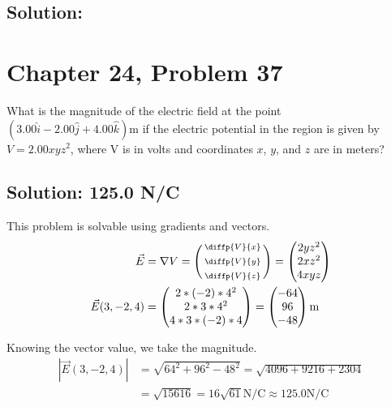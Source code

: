 \documentclass[12pt]{article}
\begin{document}
\subsection{Solution: }


\section{Chapter 24, Problem 37}
What is the magnitude of the electric field at the point $(3.00\hat{i} - 2.00\hat{j} + 4.00\hat{k}) \unit{\meter}$ if the electric potential in the region is given by $V = 2.00xyz^2$, where V is in volts and coordinates $x$, $y$, and $z$ are in meters?

\subsection*{Solution: 125.0 N/C}
This problem is solvable using gradients and vectors.
\begin{align*}
    \vec{E} &=  \nabla V
        =   \left(\begin{smallmatrix} \diffp{V}{x}\\ \\ \diffp{V}{y}\\ \\ \diffp{V}{z} \end{smallmatrix}\right)
        =   \begin{pmatrix} 2yz^2\\ 2xz^2\\ 4xyz \end{pmatrix}\\
    \vec{E}(3, -2, 4)   &=  \begin{pmatrix} 2*(-2)*4^2\\ 2*3*4^2\\ 4*3*(-2)*4 \end{pmatrix}
        =   \begin{pmatrix} -64 \\ 96 \\ -48 \end{pmatrix} \unit{\meter}
\end{align*}

Knowing the vector value, we take the magnitude.
\begin{align*}
    \left|\vec{E}(3, -2, 4)\right|  &=  \sqrt{64^2 + 96^2 - 48^2}
        =   \sqrt{4096 + 9216 + 2304}\\
        &=  \sqrt{15616}
        =   \boxed{16 \sqrt{61} \unit{\newton/\coulomb} \approx 125.0 \unit{\newton/\coulomb}}
\end{align*}
\end{document}
